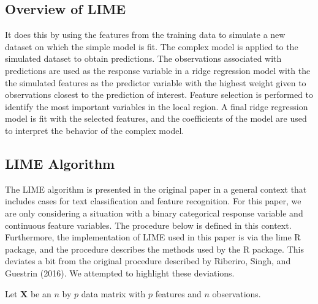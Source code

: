 \documentclass[AMS,STIX2COL]{WileyNJD-v2}
\begin{document}
\subsection{Overview of LIME}

It does this by using the features from the training data to simulate a new dataset on which the simple model is fit. The complex model is applied to the simulated dataset to obtain predictions. The observations associated with predictions are used as the response variable in a ridge regression model with the the simulated features as the predictor variable with the highest weight given to observations closest to the prediction of interest. Feature selection is performed to identify the most important variables in the local region. A final ridge regression model is fit with the selected features, and the coefficients of the model are used to interpret the behavior of the complex model.

\subsection{LIME Algorithm}

The LIME algorithm is presented in the original paper in a general context that includes cases for text classification and feature recognition. For this paper, we are only considering a situation with a binary categorical response variable and continuous feature variables. The procedure below is defined in this context. Furthermore, the implementation of LIME used in this paper is via the lime R package, and the procedure describes the methods used by the R package. This deviates a bit from the original procedure described by Riberiro, Singh, and Guestrin (2016). We attempted to highlight these deviations.

Let $\textbf{X}$ be an $n$ by $p$ data matrix with $p$ features and $n$ observations.
\end{document}

